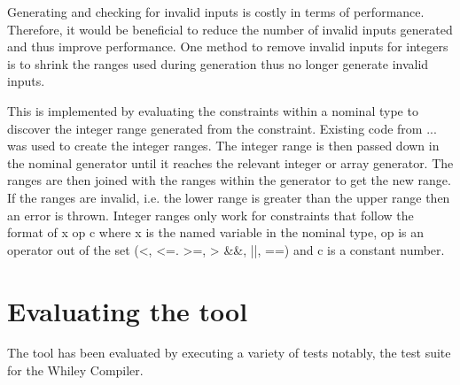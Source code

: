 Generating and checking for invalid inputs is costly in terms of performance. 
Therefore, it would be beneficial to reduce the number of invalid inputs generated and thus improve performance.
One method to remove invalid inputs for integers is to shrink the ranges used during generation thus no longer generate invalid inputs.


This is implemented by evaluating the constraints within a nominal type to discover the integer range generated from the constraint. Existing code from ... was used to create the integer ranges. 
The integer range is then passed down in the nominal generator until it reaches the relevant integer or array generator. 
The ranges are then joined with the ranges within the generator to get the new range. 
If the ranges are invalid, i.e. the lower range is greater than the upper range then an error is thrown.
Integer ranges only work for constraints that follow the format of x op c where x is the named variable in the nominal type, op is an operator out of the set (<, <=. >=, > \&\&, ||, ==) and c is a constant number.


\section{Evaluating the tool}
The tool has been evaluated by executing a variety of tests notably, the test suite for the Whiley Compiler.
